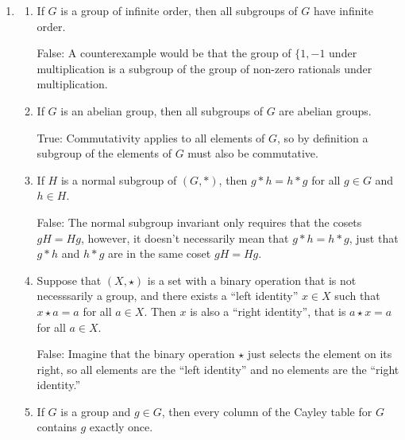\documentclass{article}
\begin{document}
\begin{enumerate}
    \item[Problem 7.] {
        \begin{enumerate}
            \item[7.1] {
                If \(G\) is a group of infinite order, then all subgroups of \(G\)
                have infinite order.

                False: A counterexample would be that the group of \(\{1, -1\) under 
                multiplication is a subgroup of the group of non-zero rationals 
                under multiplication.
            }

            \item[7.2] {
                If \(G\) is an abelian group, then all subgroups of \(G\) are abelian 
                groups.

                True: Commutativity applies to all elements of \(G\), so by definition 
                a subgroup of the elements of \(G\) must also be commutative.
            }

            \item [7.3] {
                If \(H\) is a normal subgroup of \((G, *)\), then \(g * h = h * g\) 
                for all  \(g \in G\) and \(h \in H\).

                False: The normal subgroup invariant only requires that the cosets 
                \(gH = Hg\), however, it doesn't necessarily mean that \(g * h = h * g\), 
                just that \(g * h\) and \(h * g\) are in the same coset \(gH = Hg\).
            }

            \item [7.4] {
                Suppose that \((X, \star)\) is a set with a binary operation that 
                is not necesssarily a group, and there exists a ``left identity'' 
                \(x \in X\) such that \(x \star a = a\) for all \(a \in X\). Then 
                \(x\) is also a ``right identity'', that is \(a \star x = a\) 
                for all \(a \in X\).

                False: Imagine that the binary operation \(\star\) just selects the 
                element on its right, so all elements are the ``left identity'' 
                and no elements are the ``right identity.''
            }

            \item [7.5] {
                If \(G\) is a group and \(g \in G\), then every column of the 
                Cayley table for \(G\) contains \(g\) exactly once.

}
\end{enumerate}}
\end{enumerate}
\end{document}
